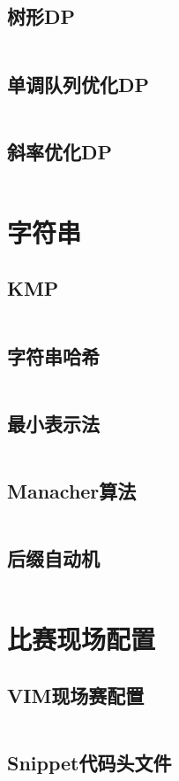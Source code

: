 \documentclass[a4paper,12pt]{article}
\begin{document}
\subsection{树形DP}
\inputminted[breaklines, linenos]{c++}{dp/treedp.cc}
\subsection{单调队列优化DP}
\inputminted[breaklines, linenos]{c++}{dp/dddl.cc}
\subsection{斜率优化DP}
\inputminted[breaklines, linenos]{c++}{dp/xielv.cc}


\newpage
\section{字符串}
\subsection{KMP}
\inputminted[breaklines, linenos]{c++}{string/kmp.cc}
\subsection{字符串哈希}
\inputminted[breaklines, linenos]{c++}{string/hash.cc}
\subsection{最小表示法}
\inputminted[breaklines, linenos]{c++}{string/minimal.cc}
\subsection{Manacher算法}
\inputminted[breaklines, linenos]{c++}{string/manacher.cc}
\subsection{后缀自动机}
\inputminted[breaklines, linenos]{c++}{string/suffix-automaton.cc}


\newpage
\section{比赛现场配置}
\subsection{VIM现场赛配置}
\inputminted[breaklines, linenos]{bash}{others/vim.bash}
\subsection{Snippet代码头文件}
\inputminted[breaklines, linenos]{c++}{others/head.cc}
\end{document}
